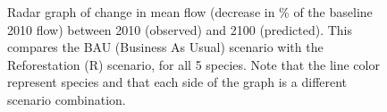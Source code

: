 \begin{figure}[h!]
 \caption[Radar graph of change in mean flow (decrease in \% of the baseline 2010 flow) between 2010 (observed) and 2100 (predicted), comparing BAU scenario with other land use change scenarios]{Radar graph of change in mean flow (decrease in \% of the baseline 2010 flow) between 2010 (observed) and 2100 (predicted). This compares the BAU (Business As Usual) scenario with the Reforestation (R) scenario, for all 5 species. Note that the line color represent species and that each side of the graph is a different scenario combination.}
 \label{fig:flow_radar_1}
\end{figure}


